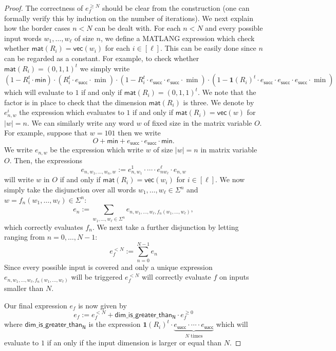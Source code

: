 \begin{proof}
The correctness of $e_f^{\geq N}$ should be clear from the construction (one can formally verify this by
induction on the number of iterations). We next explain how the border cases $n<N$ can be dealt with.
For each $n<N$ and every possible input words
$w_1,\ldots,w_\ell$ of size $n$, we define a MATLANG expression which check whether
$\mathsf{mat}(R_i)=\mathsf{vec}(w_i)$ for each $i\in[\ell]$. This can be easily done since $n$ 
can be regarded as a constant. For example, to check whether $\mathsf{mat}(R_i)=(0,1,1)^t$ we simply write
$$
(1- R_i^t\cdot \mathsf{min})\cdot (R_i^t\cdot e_{\mathsf{succ}}\cdot\min)\cdot (1- R_i^t\cdot e_{\mathsf{succ}}\cdot e_{\mathsf{succ}}\cdot \min)\cdot (1- \mathbf{1}(R_i)^t\cdot e_{\mathsf{succ}}\cdot e_{\mathsf{succ}}\cdot e_{\mathsf{succ}}\cdot \min)
$$
which will evaluate to $1$ if and only if $\mathsf{mat}(R_i)=(0,1,1)^t$. We note that the factor is in 
place to check that the dimension $\mathsf{mat}(R_i)$ is three.
  We denote by
$e_{n,w}^i$ the expression which evaluates to $1$ if and only if $\mathsf{mat}(R_i)=\mathsf{vec}(w)$
for $|w|=n$.
We can similarly
write any word $w$ of fixed size in the matrix variable $O$. For example, suppose that $w=101$
then we write 
$$
O+ \mathsf{min}+  e_{\mathsf{succ}}\cdot e_{\mathsf{succ}}\cdot\mathsf{min}.
$$
We write $e_{n,w}$ be the expression which write $w$ of size $|w|=n$ in matrix variable $O$.
Then, the expressions
$$
e_{n,w_1,\ldots,w_n,w}:=e_{n,w_1}^1\cdot\cdots\cdot e_{nw_{\ell}}^\ell\cdot e_{n,w}
$$
will write $w$ in $O$ if and only if $\mathsf{mat}(R_i)=\mathsf{vec}(w_i)$ for $i\in[\ell]$.
We now simply take the disjunction over all words 
$w_1,\ldots,w_\ell\in\Sigma^n$ and $w=f_n(w_1,\ldots,w_\ell)\in\Sigma^n$:
$$
e_n:=\sum_{w_1,\ldots,w_\ell\in\Sigma^n} e_{n,w_1,\ldots,w_\ell,f_n(w_1,\ldots,w_\ell)},
$$
which correctly evaluates $f_n$. We next take a further disjunction by letting ranging from 
$n=0,\ldots, N-1$:
$$
e_f^{<N}:=\sum_{n=0}^{N-1} e_n
$$
Since every possible input is covered and only a unique expression 
$ e_{n,w_1,\ldots,w_\ell,f_n(w_1,\ldots,w_\ell)}$ will be triggered $e_f^{<N}$ will correctly
evaluate $f$ on inputs smaller than $N$.

Our final expression $e_f$ is now given by
$$
e_f:=e_f^{<N} + \mathsf{dim\_is\_greater\_than_N}\cdot e_f^{\geq 0}
$$
where $\mathsf{dim\_is\_greater\_than_N}$ is the expression
$\mathbf{1}(R_i)^t\cdot\underbrace{e_{\mathsf{succ}}\cdot\cdots\cdot e_{\mathsf{succ}}}_{\text{$N$ times}}$ 
which will evaluate to $1$ if an only if the input dimension is larger or equal than $N$.
\end{proof}
